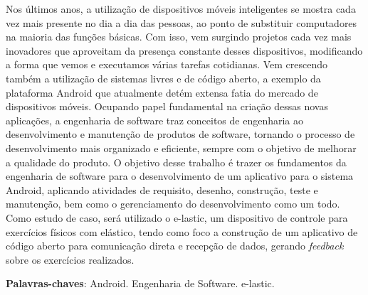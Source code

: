 \begin{resumo}

Nos últimos anos, a utilização de dispositivos móveis inteligentes se mostra cada vez mais presente no dia a dia das pessoas, ao ponto de substituir computadores na maioria das funções básicas. Com isso, vem surgindo projetos cada vez mais inovadores que aproveitam da presença constante desses dispositivos, modificando a forma que vemos e executamos várias tarefas cotidianas. Vem crescendo também a utilização de sistemas livres e de código aberto, a exemplo da plataforma Android que atualmente detém extensa fatia do mercado de dispositivos móveis. Ocupando papel fundamental na criação dessas novas aplicações, a engenharia de software traz conceitos de engenharia ao desenvolvimento e manutenção de produtos de software, tornando o processo de desenvolvimento mais organizado e eficiente, sempre com o objetivo de melhorar a qualidade do produto. O objetivo desse trabalho é trazer os fundamentos da engenharia de software para o desenvolvimento de um aplicativo para o sistema Android, aplicando atividades de requisito, desenho, construção, teste e manutenção, bem como o gerenciamento do desenvolvimento como um todo. Como estudo de caso, será utilizado o e-lastic, um dispositivo de controle para exercícios físicos com elástico, tendo como foco a construção de um aplicativo de código aberto para comunicação direta e recepção de dados, gerando \textit{feedback} sobre os exercícios realizados.

\vspace{\onelineskip}
    
 \noindent
 \textbf{Palavras-chaves}: Android. Engenharia de Software. e-lastic.

\end{resumo}
